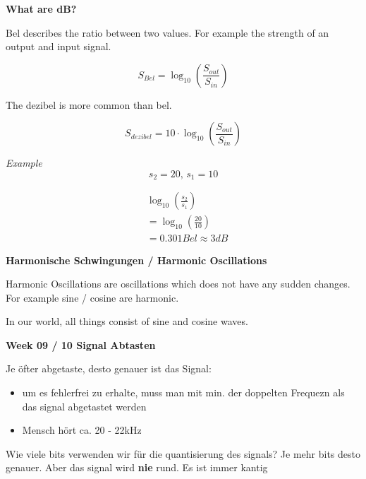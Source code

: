 \documentclass[11pt,twoside,twocolumn,landscape]{article}
\begin{document}
\textbf{What are dB?}

Bel describes the ratio between two values.
For example the strength of an output and input signal.

\begin{equation}
S_{Bel} = \log_{10}(\frac{S_{out}}{S_{in}})
\end{equation}

The dezibel is more common than bel.

\begin{equation}
S_{dezibel} = 10 \cdot \log_{10}(\frac{S_{out}}{S_{in}})
\end{equation}

\emph{Example}
\begin{equation}
s_2 = 20,\, s_1 = 10
\end{equation}

\begin{align}
&  \log_{10}(\frac{s_2}{s_1}) \\
&= \log_{10}(\frac{20}{10}) \\
&= 0.301Bel \approx 3 dB
\end{align}

\textbf{Harmonische Schwingungen / Harmonic Oscillations}

Harmonic Oscillations are oscillations which does not have any sudden changes.
For example sine / cosine are harmonic.

In our world, all things consist of sine and cosine waves.

\textbf{Week 09 / 10 Signal Abtasten}

Je öfter abgetaste, desto genauer ist das Signal:
\begin{itemize}
\item um es fehlerfrei zu erhalte, muss man mit min. der doppelten Frequezn als das signal abgetastet werden
\item Mensch hört ca. 20 - 22kHz
\end{itemize}

Wie viele bits verwenden wir für die quantisierung des signals?
Je mehr bits desto genauer. Aber das signal wird \textbf{nie} rund.
Es ist immer kantig
\end{document}
